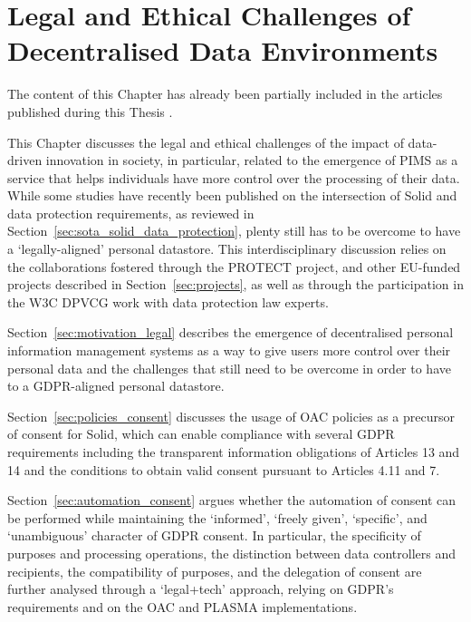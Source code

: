 \chapter{Legal and Ethical Challenges of Decentralised Data Environments}
\label{chap:legal}

\begin{tcolorbox}[colback=royallavender!40]
The content of this Chapter has already been partially included in the articles published during this Thesis \citep{esteves_fostering_2022,asgarinia_who_2023,florea_is_2023}.
\end{tcolorbox}

This Chapter discusses the legal and ethical challenges of the impact of data-driven innovation in society, in particular, related to the emergence of PIMS as a service that helps individuals have more control over the processing of their data.
While some studies have recently been published on the intersection of Solid and data protection requirements, as reviewed in Section~\ref{sec:sota_solid_data_protection}, plenty still has to be overcome to have a `legally-aligned' personal datastore.
This interdisciplinary discussion relies on the collaborations fostered through the PROTECT project, and other EU-funded projects described in Section~\ref{sec:projects}, as well as through the participation in the W3C DPVCG work with data protection law experts.

Section~\ref{sec:motivation_legal} describes the emergence of decentralised personal information management systems as a way to give users more control over their personal data and the challenges that still need to be overcome in order to have to a GDPR-aligned personal datastore.

Section~\ref{sec:policies_consent} discusses the usage of OAC policies as a precursor of consent for Solid, which can enable compliance with several GDPR requirements including the transparent information obligations of Articles 13 and 14 and the conditions to obtain valid consent pursuant to Articles 4.11 and 7.

Section~\ref{sec:automation_consent} argues whether the automation of consent can be performed while maintaining the `informed', `freely given', `specific', and `unambiguous' character of GDPR consent.
In particular, the specificity of purposes and processing operations, the distinction between data controllers and recipients, the compatibility of purposes, and the delegation of consent are further analysed through a `legal+tech' approach, relying on GDPR's requirements and on the OAC and PLASMA implementations.

